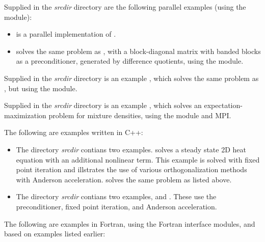 \vspace{0.2in}\noindent
Supplied in the {\em srcdir} directory are
the following parallel examples (using the {\nvecp} module):
\begin{itemize}
\item {}
  is a parallel implementation of .
\item {}
  solves the same problem as , with a block-diagonal matrix
  with banded blocks as a preconditioner, generated by difference quotients,
  using the {\kinbbdpre} module.
\end{itemize}

\vspace{0.2in}\noindent
Supplied in the {\em srcdir} directory
is an example , which solves the same problem
as , but using the  {\nector} module.

\vspace{0.2in}\noindent
Supplied in the {\em srcdir} directory
is an example , which solves an
expectation-maximization problem for mixture densities, using the
 {\nvector} module and MPI.

\vspace{0.2in}\noindent 
The following are examples written in C++:
\begin{itemize}

\item The directory {\em srcdir}
  contians two examples.  solves a
  steady state 2D heat equation with an additional nonlinear term.
  This example is solved with fixed point iteration and illstrates
  the use of various orthogonalization methods with Anderson
  acceleration.
   solves the same problem as 
  listed above.

\item The directory {\em srcdir}
  contians two examples,  and
  .  These use the 
   preconditioner, fixed point iteration, and Anderson
  acceleration.

\end{itemize}
  
\vspace{0.2in}\noindent
The following are examples in Fortran, using the {\sundials}
Fortran interface modules, and based on examples listed earlier:

